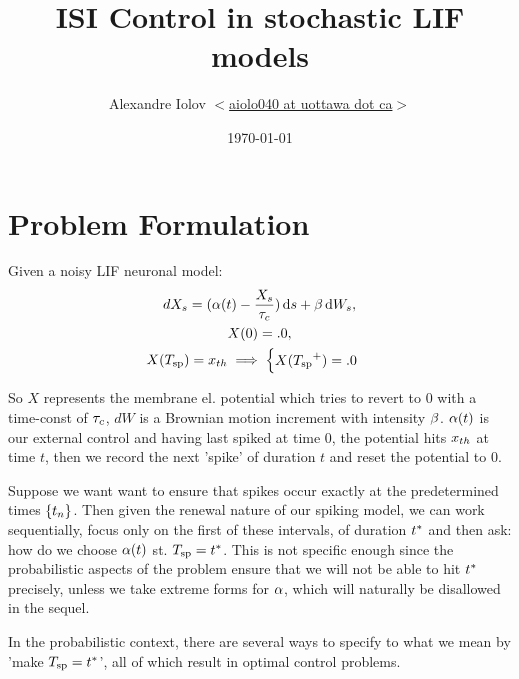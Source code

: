\documentclass{article}
\begin{document}
\title{ISI Control in stochastic LIF models}
\author{Alexandre Iolov 
$<$\href{mailto:aiolo040@uottawa.ca}
		{aiolo040 at uottawa dot ca}$>$}

\date{\today}

\maketitle


\tableofcontents

\section{Problem Formulation}
Given a noisy LIF neuronal model:
\begin{equation}
\begin{gathered}
dX_s = ({\alpha}(t) - \frac{X_s}{{ \tau_{c} }} ) \, \mathrm{d} s + {\beta} \, \mathrm{d} W_s,
\\
X(0) = .0,
\\
X({ T_{\textrm{sp} } }) = { x_{th} } \implies  
\begin{cases}
X({ T_{\textrm{sp} } }^+) = .0 &  
\end{cases}
\end{gathered}
\label{eq:X_evolution_uo}
\end{equation}

So $X$ represents the membrane el. potential which tries to revert to $0$ with a
time-const of ${ \tau_{c} }$, $dW$ is a Brownian motion increment with intensity ${\beta}$.
${\alpha}(t)$ is our external control and having last spiked at time $0$, the
potential hits ${ x_{th} }$ at time
$t$, then we record the next 'spike' of duration $t$ and reset the potential to
$0$. 

Suppose we want want to ensure that spikes occur exactly at the predetermined
times ${ \{t_n \} }$. Then given the renewal nature of our spiking model, we can work
sequentially, focus only on the first of these intervals, of duration ${ t^* }$ and
then ask: how do we choose ${\alpha}(t)$ st. ${ T_{\textrm{sp} } }= { t^* }$. This is not specific enough
since the probabilistic aspects of the problem ensure that we will not be able
to hit ${ t^* }$ precisely, unless we take extreme forms for ${\alpha}$, which will
naturally be disallowed in the sequel.

In the probabilistic context, there are several ways to specify to what we
mean by 'make ${ T_{\textrm{sp} } } = { t^* }$', all of which result in optimal control problems.
\end{document}

